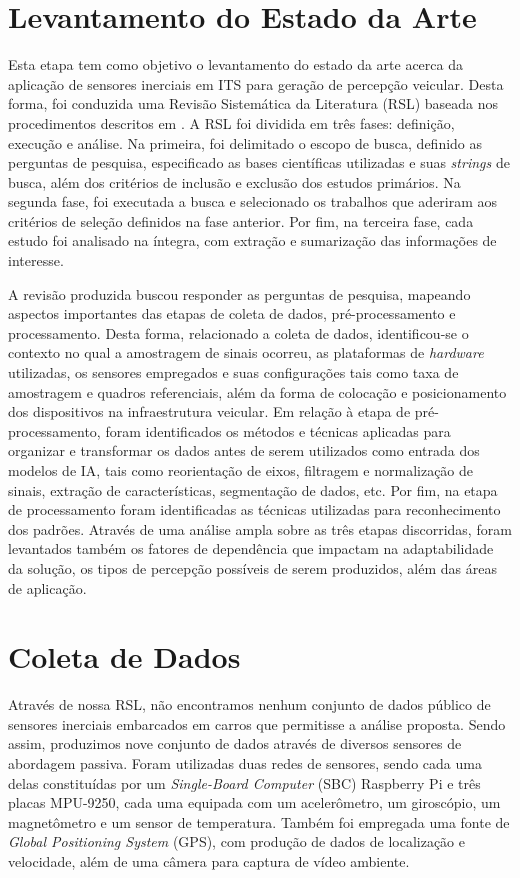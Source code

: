 \section{Levantamento do Estado da Arte}

Esta etapa tem como objetivo o levantamento do estado da arte acerca da aplicação de sensores inerciais em ITS para geração de percepção veicular. Desta forma, foi conduzida uma Revisão Sistemática da Literatura (RSL) baseada nos procedimentos descritos em \cite{kitchenham2004,kitchenham2009,biolchini2005}. A RSL foi dividida em três fases: definição, execução e análise. Na primeira, foi delimitado o escopo de busca, definido as perguntas de pesquisa, especificado as bases científicas utilizadas e suas \textit{strings} de busca, além dos critérios de inclusão e exclusão dos estudos primários. Na segunda fase, foi executada a busca e selecionado os trabalhos que aderiram aos critérios de seleção definidos na fase anterior. Por fim, na terceira fase, cada estudo foi analisado na íntegra, com extração e sumarização das informações de interesse.

A revisão produzida buscou responder as perguntas de pesquisa, mapeando aspectos importantes das etapas de coleta de dados, pré-processamento e processamento. Desta forma, relacionado a coleta de dados, identificou-se o contexto no qual a amostragem de sinais ocorreu, as plataformas de \textit{hardware} utilizadas, os sensores empregados e suas configurações tais como taxa de amostragem e quadros referenciais, além da forma de colocação e posicionamento dos dispositivos na infraestrutura veicular. Em relação à etapa de pré-processamento, foram identificados os métodos e técnicas aplicadas para organizar e transformar os dados antes de serem utilizados como entrada dos modelos de IA, tais como reorientação de eixos, filtragem e normalização de sinais, extração de características, segmentação de dados, etc. Por fim, na etapa de processamento foram identificadas as técnicas utilizadas para reconhecimento dos padrões. Através de uma análise ampla sobre as três etapas discorridas, foram levantados também os fatores de dependência que impactam na adaptabilidade da solução, os tipos de percepção possíveis de serem produzidos, além das áreas de aplicação.

\section{Coleta de Dados}

Através de nossa RSL, não encontramos nenhum conjunto de dados público de sensores inerciais embarcados em carros que permitisse a análise proposta. Sendo assim, produzimos nove conjunto de dados através de diversos sensores de abordagem passiva. Foram utilizadas duas redes de sensores, sendo cada uma delas constituídas por um \textit{Single-Board Computer} (SBC) Raspberry Pi e três placas MPU-9250, cada uma equipada com um acelerômetro, um giroscópio, um magnetômetro e um sensor de temperatura. Também foi empregada uma fonte de \textit{Global Positioning System} (GPS), com produção de dados de localização e velocidade, além de uma câmera para captura de vídeo ambiente.

